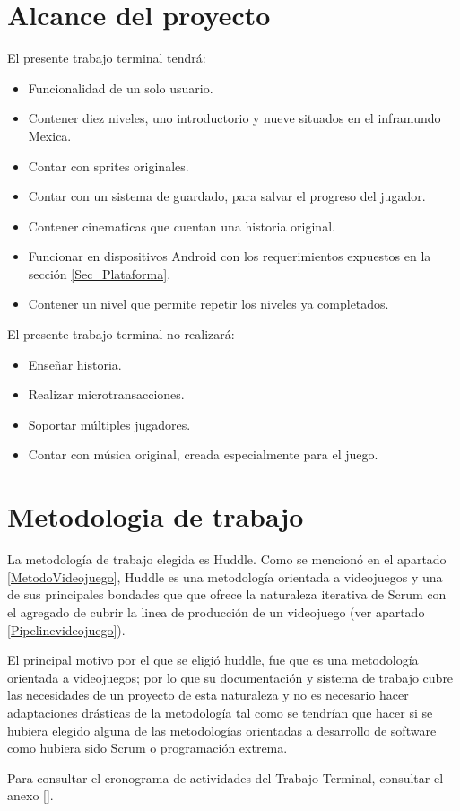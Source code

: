	\section{Alcance del proyecto} \label{Sec_Alcance}
		El presente trabajo terminal tendrá:
			\begin{itemize}
				\item Funcionalidad de un solo usuario.
				\item Contener diez niveles, uno introductorio y nueve situados en el
				 inframundo Mexica.
				\item Contar con sprites originales.
				\item Contar con un sistema de guardado, para salvar el progreso del 
				jugador.
				\item Contener cinematicas que cuentan una historia original.
				\item Funcionar en dispositivos Android con los requerimientos expuestos 
				en la sección \ref{Sec_Plataforma}.
				\item Contener un nivel que permite repetir los niveles ya completados. 
			\end{itemize}
		El presente trabajo terminal no realizará:
		\begin{itemize}
			\item Enseñar historia.
			\item Realizar microtransacciones.
			\item Soportar múltiples jugadores.
			\item Contar con música original, creada especialmente para el juego.
		\end{itemize}
	\section{Metodologia de trabajo}\label{Sec_Metodologia}
	La metodología de trabajo elegida es Huddle. Como se mencionó en el apartado
	 \ref{MetodoVideojuego}, Huddle es una metodología orientada a videojuegos y una
	  de sus principales bondades que que ofrece la naturaleza iterativa de Scrum 
	  con el agregado de cubrir la linea de producción de un videojuego 
	  (ver apartado \ref{Pipelinevideojuego}).
	\\
	\par
	El principal motivo por el que se eligió huddle, fue que es una metodología 
	orientada a videojuegos; por lo que su documentación y sistema de trabajo cubre 
	las necesidades de un proyecto de esta naturaleza y no es necesario hacer 
	adaptaciones drásticas de la metodología tal como se tendrían que hacer si se 
	hubiera elegido alguna de las metodologías orientadas a desarrollo de software 
	como hubiera sido Scrum o programación extrema. 
	\\
	\par
	Para consultar el cronograma de actividades del Trabajo Terminal, consultar el anexo \ref{}.
	
